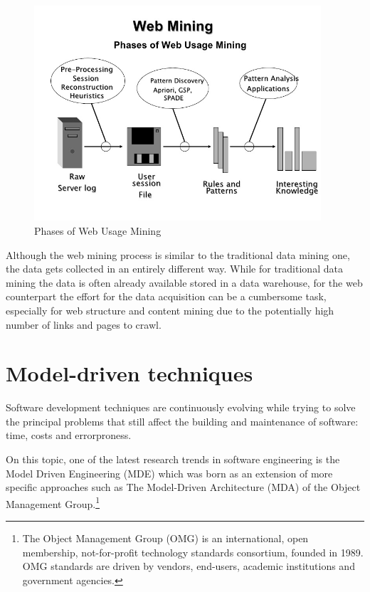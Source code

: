 \vspace{0.5cm}
\begin{figure}[!htbp]
  \centering
    \includegraphics[height=8cm]{images/webmining}
  \caption{Phases of Web Usage Mining}
  \label{fig:webmining}
\end{figure}
\vspace{0.5cm}


Although the web mining process is similar to the traditional data mining one, the data gets collected in an entirely different way. While for traditional data mining the data is often already available stored in a data warehouse, for the web counterpart the effort for the data acquisition can be a cumbersome task, especially for web structure and content mining due to the potentially high number of links and pages to crawl.

\section{Model-driven techniques}

Software development techniques are continuously evolving while trying to solve the principal problems that still affect the building and maintenance of software: time, costs and errorproness.

On this topic, one of the latest research trends in software engineering is the Model Driven Engineering (MDE) which was born as an extension of more specific approaches such as The Model-Driven Architecture (MDA) of the Object Management Group.\footnote{The Object Management Group (OMG) is an international, open membership, not-for-profit technology standards consortium, founded in 1989. OMG standards are driven by vendors, end-users, academic institutions and government agencies. } 

